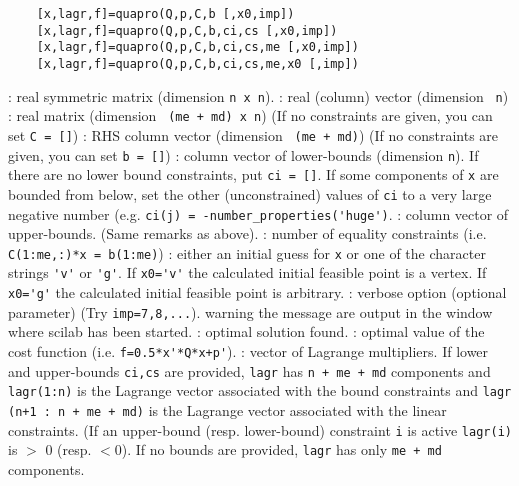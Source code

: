 
\begin{mandesc}
\end{mandesc}
\label{quapro}
\begin{calling_sequence}
  \begin{verbatim}
    [x,lagr,f]=quapro(Q,p,C,b [,x0,imp])  
    [x,lagr,f]=quapro(Q,p,C,b,ci,cs [,x0,imp])  
    [x,lagr,f]=quapro(Q,p,C,b,ci,cs,me [,x0,imp])  
    [x,lagr,f]=quapro(Q,p,C,b,ci,cs,me,x0 [,imp])  
  \end{verbatim}
\end{calling_sequence}
\begin{parameters}
  \begin{varlist}
    : real symmetric matrix (dimension \verb!n x n!).
    : real (column) vector (dimension \verb! n!)
    : real matrix (dimension \verb! (me + md) x n!) (If no constraints are given, you can set \verb!C = []!)
   : RHS column vector (dimension \verb! (me + md)!) (If no constraints are given, you can set \verb!b = []!)
   : column vector of lower-bounds (dimension \verb!n!). If there are no lower bound constraints, put \verb!ci = []!. If some components of \verb!x! are bounded from below, set the other (unconstrained) values of \verb!ci! to a very  large negative  number (e.g. \verb!ci(j) = -number_properties('huge')!.
   : column vector of upper-bounds. (Same remarks as above).
   : number of equality constraints (i.e. \verb!C(1:me,:)*x = b(1:me)!)
   : either an initial guess for \verb!x!    or one of the character strings \verb!'v'! or \verb!'g'!. If \verb!x0='v'! the calculated initial feasible point is a vertex. If \verb!x0='g'! the calculated initial feasible point is arbitrary.
   : verbose option (optional parameter)   (Try \verb!imp=7,8,...!). warning the message are output in the window where scilab has been started.
   : optimal solution found.
   : optimal value of the cost function (i.e. \verb!f=0.5*x'*Q*x+p'!).
   : vector of Lagrange multipliers.  If lower and upper-bounds \verb!ci,cs! are provided, \verb!lagr! has  \verb!n + me + md! components and \verb!lagr(1:n)! is the Lagrange  vector associated with the bound constraints and  \verb!lagr (n+1 : n + me + md)! is the Lagrange vector associated  with the linear constraints. (If an upper-bound (resp. lower-bound) constraint \verb!i! is active  \verb!lagr(i)! is $>$ 0 (resp. $<$0). If no bounds are provided, \verb!lagr! has only \verb!me + md! components.
  \end{varlist}

\end{parameters}


